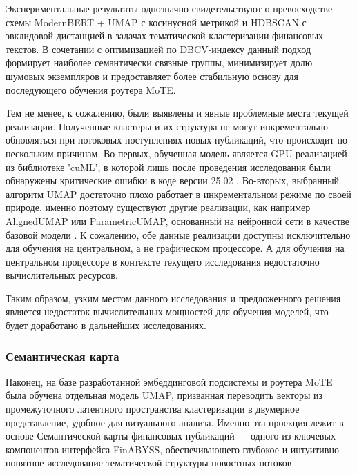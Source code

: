 

Экспериментальные результаты однозначно свидетельствуют о превосходстве схемы ModernBERT + UMAP
с косинусной метрикой и HDBSCAN с эвклидовой дистанцией в задачах тематической кластеризации
финансовых текстов. В сочетании с оптимизацией по DBCV-индексу данный подход формирует наиболее
семантически связные группы, минимизирует долю шумовых экземпляров и предоставляет более стабильную
основу для последующего обучения роутера MoTE.

Тем не менее, к сожалению, были выявлены и явные проблемные места текущей реализации.
Полученные кластеры и их структура не могут инкрементально обновляться при потоковых
поступлениях новых публикаций, что происходит по нескольким причинам. Во-первых, обученная
модель является GPU-реализацией из библиотеке 'cuML', в которой лишь после проведения исследования
были обнаружены критические ошибки в коде версии 25.02 \parencite{cuml2020machine}. Во-вторых, выбранный
алгоритм UMAP достаточно плохо работает в инкрементальном режиме по своей природе, именно
поэтому существуют другие реализации, как например AlignedUMAP \parencite{mcinnes2018umap-software}
или ParametricUMAP, основанный на нейронной сети в качестве базовой модели \parencite{ParametricUMAP2020}.
К сожалению, обе данные реализации доступны исключительно для обучения на центральном, а не графическом процессоре.
А для обучения на центральном процессоре в контексте текущего исследования недостаточно вычислительных ресурсов.

Таким образом, узким местом данного исследования и предложенного решения является недостаток вычислительных
мощностей для обучения моделей, что будет доработано в дальнейших исследованиях.

\subsubsection{Семантическая карта}

Наконец, на базе разработанной эмбеддинговой подсистемы и роутера MoTE была обучена отдельная модель UMAP,
призванная переводить векторы из промежуточного латентного пространства кластеризации в двумерное представление,
удобное для визуального анализа. Именно эта проекция лежит в основе Семантической карты финансовых публикаций ---
одного из ключевых компонентов интерфейса FinABYSS, обеспечивающего глубокое и интуитивно понятное исследование
тематической структуры новостных потоков.

